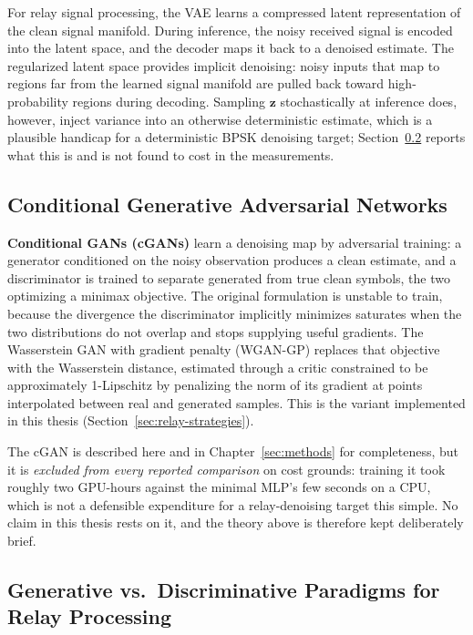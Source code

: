 For relay signal processing, the VAE learns a compressed latent representation of the clean signal manifold. During inference, the noisy received signal is encoded into the latent space, and the decoder maps it back to a denoised estimate. The regularized latent space provides implicit denoising: noisy inputs that map to regions far from the learned signal manifold are pulled back toward high-probability regions during decoding. Sampling \(\mathbf{z}\) stochastically at inference does, however, inject variance into an otherwise deterministic estimate, which is a plausible handicap for a deterministic BPSK denoising target; Section~\ref{sec:generative-vs.-discriminative-paradigms-for-relay-processing} reports what this is and is not found to cost in the measurements.

\subsection{Conditional Generative Adversarial Networks}\label{sec:conditional-generative-adversarial-networks}

\textbf{Conditional GANs (cGANs)} \cite{MirzaOsindero2014cGAN} learn a denoising map by adversarial training: a generator conditioned on the noisy observation produces a clean estimate, and a discriminator is trained to separate generated from true clean symbols, the two optimizing a minimax objective. The original formulation is unstable to train, because the divergence the discriminator implicitly minimizes saturates when the two distributions do not overlap and stops supplying useful gradients. The Wasserstein GAN with gradient penalty (WGAN-GP) \cite{Gulrajani2017WGANGP} replaces that objective with the Wasserstein distance, estimated through a critic constrained to be approximately 1-Lipschitz by penalizing the norm of its gradient at points interpolated between real and generated samples. This is the variant implemented in this thesis (Section~\ref{sec:relay-strategies}).

The cGAN is described here and in Chapter~\ref{sec:methods} for completeness, but it is \emph{excluded from every reported comparison} on cost grounds: training it took roughly two GPU-hours against the minimal MLP's few seconds on a CPU, which is not a defensible expenditure for a relay-denoising target this simple. No claim in this thesis rests on it, and the theory above is therefore kept deliberately brief.

\subsection{Generative vs.~Discriminative Paradigms for Relay Processing}\label{sec:generative-vs.-discriminative-paradigms-for-relay-processing}

